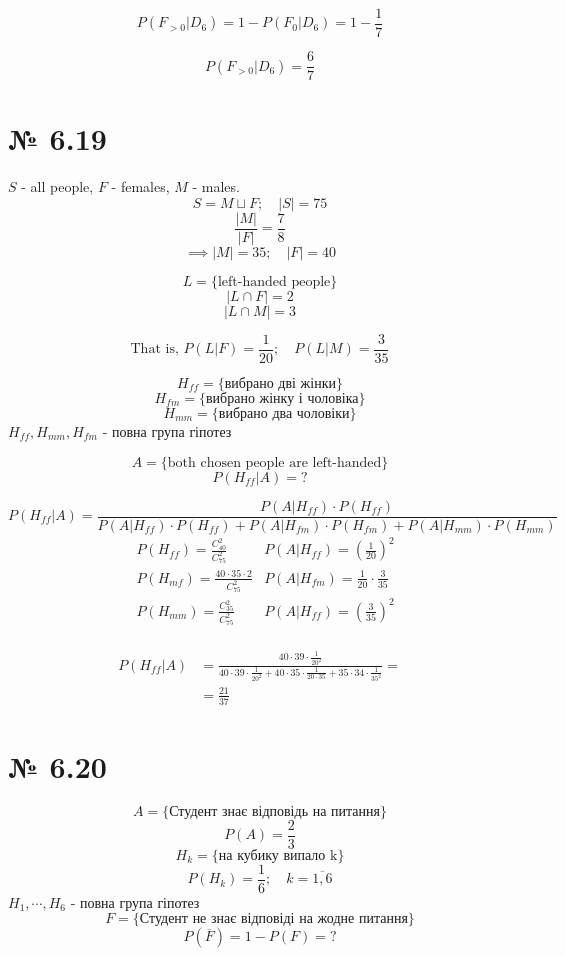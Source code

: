 \documentclass[11pt, a4paper]{article} %
\begin{document}
$$P(F_{>0} | D_6) = 1 - P(F_0 | D_6) = 1 - \frac{1}{7}$$

\begin{mdframed}[style=ans]
    $$P(F_{>0} | D_6) = \frac{6}{7}$$
\end{mdframed}

\section*{№ 6.19}
$S$ - all people, $F$ - females, $M$ - males.
$$S = M \sqcup F;\quad |S| = 75$$
$$\frac{|M|}{|F|} = \frac{7}{8}$$
$$\implies |M| = 35;\quad |F| = 40$$

$$L = \{\text{left-handed people}\}$$
$$|L\cap F| = 2$$
$$|L\cap M| = 3$$

$$\text{That is, } P(L|F) = \frac{1}{20}; \quad P(L|M) = \frac{3}{35}$$

$$H_{ff} = \{\text{вибрано дві жінки}\}$$
$$H_{fm} = \{\text{вибрано жінку і чоловіка}\}$$
$$H_{mm} = \{\text{вибрано два чоловіки}\}$$
$H_{ff}, H_{mm}, H_{fm}$ - повна група гіпотез

$$A = \{\text{both chosen people are left-handed}\}$$
$$P(H_{ff}|A) = ?$$

$$P(H_{ff}|A) = \frac{P(A|H_{ff})\cdot P(H_{ff})}{P(A|H_{ff})\cdot P(H_{ff}) + P(A|H_{fm})\cdot P(H_{fm}) + P(A|H_{mm})\cdot P(H_{mm})}$$
\begin{align*}
    & P(H_{ff}) = \frac{C_{40}^2}{C_{75}^2} 
    & P(A|H_{ff}) = \left(\frac{1}{20}\right)^2 \\
    & P(H_{mf}) = \frac{40\cdot 35 \cdot 2}{C_{75}^2} 
    & P(A|H_{fm}) = \frac{1}{20}\cdot\frac{3}{35} \\
    & P(H_{mm}) = \frac{C_{35}^2}{C_{75}^2} 
    & P(A|H_{ff}) = \left(\frac{3}{35}\right)^2 \\
\end{align*}

\begin{mdframed}[style=ans]
    
\begin{align*}
    P(H_{ff}|A) &= \frac{40 \cdot 39 \cdot \frac{1}{20^2}}{40\cdot 39\cdot \frac{1}{20^2} + 40\cdot 35 \cdot \frac{1}{20\cdot 35} + 35\cdot 34\cdot \frac{1}{35^2}} = \\
    &=\frac{21}{37}
\end{align*}
\end{mdframed}

\section*{№ 6.20}
$$A = \{\text{Студент знає відповідь на питання}\}$$
$$P(A) = \frac{2}{3}$$
$$H_k = \{\text{на кубику випало k}\}$$
$$P(H_k) = \frac{1}{6};\quad k=\overline{1,6}$$
$H_1, \cdots, H_6$ - повна група гіпотез
$$F = \{\text{Студент не знає відповіді на жодне питання}\}$$
$$P(\overline{F}) = 1-P(F) = ?$$
\end{document}
